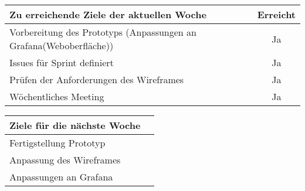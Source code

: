 \begin{tabularx}{\textwidth}{Xc}
    \arrayrulecolor{OliveGreen}
    \toprule
    {\bfseries Zu erreichende Ziele der aktuellen Woche} & {\bfseries Erreicht} \\
    \midrule[2pt]
    Vorbereitung des Prototyps (Anpassungen an Grafana(Weboberfläche)) &Ja   \\
    \rowcolor{OliveGreen!15}
    Issues für Sprint definiert                                        &Ja   \\
    \rowcolor{OliveGreen!15}
    Prüfen der Anforderungen des Wireframes                            &Ja   \\
    \rowcolor{OliveGreen!15}
    Wöchentliches Meeting                                              &Ja   \\
   \bottomrule[2pt]
\end{tabularx}
%
\vspace{1cm}
%
\begin{tabularx}{\textwidth}{Xc}
    \arrayrulecolor{OliveGreen}
    \toprule
    {\bfseries Ziele für die nächste Woche}          &                      \\
    \midrule[2pt]
    Fertigstellung Prototyp                          &                      \\
    \rowcolor{OliveGreen!15}
    Anpassung des Wireframes                         &                      \\
    \rowcolor{OliveGreen!15}
    Anpassungen an Grafana                           &                      \\
\end{tabularx}
